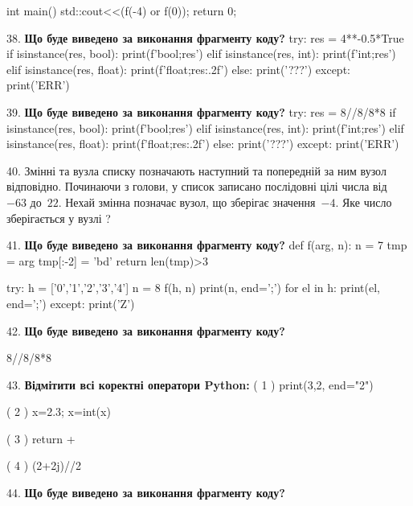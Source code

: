 \documentclass[11pt]{article}
\begin{document}
int main(){
    std::cout<<(f(-4) or f(0));
    return 0;
}
\par\vspace{5mm}
38. \textbf{Що буде виведено за виконання фрагменту коду?}
try:
    res = 4**-0.5*True
    if isinstance(res, bool):
        print(f'bool;{res}')
    elif isinstance(res, int):
        print(f'int;{res}')
    elif isinstance(res, float):
        print(f'float;{res:.2f}')
    else:
        print('???')
except:
    print('ERR')
\par\vspace{5mm}
39. \textbf{Що буде виведено за виконання фрагменту коду?}
try:
    res = 8//8/8*8
    if isinstance(res, bool):
        print(f'bool;{res}')
    elif isinstance(res, int):
        print(f'int;{res}')
    elif isinstance(res, float):
        print(f'float;{res:.2f}')
    else:
        print('???')
except:
    print('ERR')
\par\vspace{5mm}
40. 
Змінні  та  вузла списку позначають наступний та попередній за ним вузол відповідно. Починаючи з голови, у список записано послідовні цілі числа від~$-63$ до~$22$. Нехай змінна  позначає вузол, що зберігає значення~$-4$.
Яке число зберігається у вузлі  ?
\par\vspace{5mm}
41. \textbf{Що буде виведено за виконання фрагменту коду?}
def f(arg, n):
    n = 7
    tmp = arg
    tmp[:-2] = 'bd'
    return len(tmp)>3

try:
    h = ['0','1','2','3','4']
    n = 8
    f(h, n)
    print(n, end=';')
    for el in h:
        print(el, end=';')
except:
    print('Z')
\par\vspace{5mm}
42. \textbf{Що буде виведено за виконання фрагменту коду?}

8//8/8*8
\par\vspace{5mm}
43. %
\textbf{Відмітити всі коректні оператори Python:}
( 1 ) print(3,2, end="2")

( 2 ) x=2.3; x=int(x)

( 3 ) return +

( 4 ) (2+2j)//2
\par\vspace{5mm}
44. \textbf{Що буде виведено за виконання фрагменту коду?}
\end{document}
